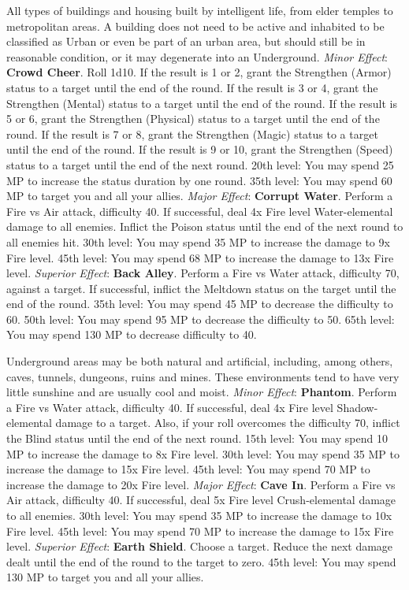\begin{multicols}{2}
    \ferrum

    All types of buildings and housing built by intelligent life, from elder temples to metropolitan areas. A building does not need to be active and inhabited to be classified as Urban or even be part of an urban area, but should still be in reasonable condition, or it may degenerate into an Underground.
	\textit{Minor Effect}: \textbf{Crowd Cheer}. Roll 1d10. If the result is 1 or 2, grant the Strengthen (Armor) status to a target until the end of the round. If the result is 3 or 4, grant the Strengthen (Mental) status to a target until the end of the round. If the result is 5 or 6, grant the Strengthen (Physical) status to a target until the end of the round. If the result is 7 or 8, grant the Strengthen (Magic) status to a target until the end of the round. If the result is 9 or 10, grant the Strengthen (Speed) status to a target until the end of the next round. 20th level: You may spend 25 MP to increase the status duration by one round. 35th level: You may spend 60 MP to target you and all your allies.
	\textit{Major Effect}: \textbf{Corrupt Water}. Perform a Fire vs Air attack, difficulty 40. If successful, deal 4x Fire level Water-elemental damage to all enemies. Inflict the Poison status until the end of the next round to all enemies hit. 30th level: You may spend 35 MP to increase the damage to 9x Fire level. 45th level: You may spend 68 MP to increase the damage to 13x Fire level.
	\textit{Superior Effect}: \textbf{Back Alley}. Perform a Fire vs Water attack, difficulty 70, against a target. If successful, inflict the Meltdown status on the target until the end of the round. 35th level: You may spend 45 MP to decrease the difficulty to 60. 50th level: You may spend 95 MP to decrease the difficulty to 50. 65th level: You may spend 130 MP to decrease difficulty to 40.

    \ferrum

    Underground areas may be both natural and artificial, including, among others, caves, tunnels, dungeons, ruins and mines. These environments tend to have very little sunshine and are usually cool and moist.
	\textit{Minor Effect}: \textbf{Phantom}. Perform a Fire vs Water attack, difficulty 40. If successful, deal 4x Fire level Shadow-elemental damage to a target. Also, if your roll overcomes the difficulty 70, inflict the Blind status until the end of the next round. 15th level: You may spend 10 MP to increase the damage to 8x Fire level. 30th level: You may spend 35 MP to increase the damage to 15x Fire level. 45th level: You may spend 70 MP to increase the damage to 20x Fire level.
    \textit{Major Effect}: \textbf{Cave In}. Perform a Fire vs Air attack, difficulty 40. If successful, deal 5x Fire level Crush-elemental damage to all enemies. 30th level: You may spend 35 MP to increase the damage to 10x Fire level. 45th level: You may spend 70 MP to increase the damage to 15x Fire level.
	\textit{Superior Effect}: \textbf{Earth Shield}. Choose a target. Reduce the next damage dealt until the end of the round to the target to zero. 45th level: You may spend 130 MP to target you and all your allies.


\end{multicols}
